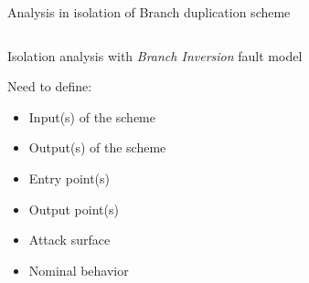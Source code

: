 \begin{frame}[fragile]{Analysis in isolation of Branch duplication scheme}
\begin{columns}
\begin{small}
\begin{column}{0.7\textwidth}
                Isolation analysis with \textit{Branch Inversion} fault model                
                \vspace{0.3cm}
                
                 {
                    Need to define:
                    \begin{itemize}
                        \item Input(s) of the scheme
                        \item Output(s) of the scheme 
                        \item Entry point(s) 
                        \item Output point(s) 
                        \item Attack surface 
                        \item Nominal behavior 
                    \end{itemize}
                }
            \end{column}
        \end{small}
    \end{columns}
\end{frame}

